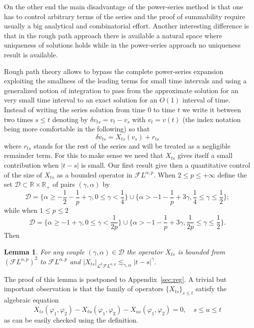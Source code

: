 \documentclass[a4paper,11pt,reqno]{article}
\newcommand{\der}{\delta}
\newcommand{\RR}{\mathbb{R}}
\newcommand{\DD}{\mathcal{D}}
\newcommand{\FF}{\mathcal{F}}
\newcommand{\LL}{\mathcal{L}}
\newtheorem{lemma}[theorem]{Lemma}
\begin{document}
  On the other end the main disadvantage  of the power-series method is that one has to control  arbitrary terms of the series and the proof of summability require usually a big analytical and combinatorial effort. 
  Another interesting difference is that in the rough path approach there is available a natural space where uniqueness of solutions holds while in the power-series approach no uniqueness result is available.

  Rough path theory allows to bypass the complete power-series expansion exploiting the smallness  of the leading terms for small time intervals and using a generalized notion of integration to pass from the approximate solution for an very small time interval to an exact solution for an $O(1)$ interval of time. 
Instead of writing the series solution from time $0$ to time $t$ we write it between two times $ s \le t$ denoting by $\der v_{ts} = v_t - v_s$ with $v_t = v(t)$ (the index
notation being more comfortable in the following) so that
\begin{equation}
\label{eq:kdv-base-remainder}
 \der v_{ts} = X_{ts}(v_s) + r_{ts}
\end{equation}
where $r_{ts}$ stands for the rest of the series and will be treated  as a negligible remainder term. For this to make sense we need that $X_{ts}$ gives itself a small contribution when $|t-s|$ is small. Our first result give then a quantitative control of the size of $X_{ts}$ as a bounded operator in $\FF L^{\alpha,p}$.
When $2\le p\le +\infty$ define the set $\DD\subset \RR \times \RR_+$ of pairs $(\gamma,\alpha)$ by
$$\DD =\{
\alpha \ge -\frac{1}{2}-\frac 1 p + \gamma, 0 \le \gamma < \frac14 
\} \cup
\{
\alpha > -1-\frac 1 p + 3\gamma, \frac1 4 \le \gamma \le \frac12 \} ;
$$
while when $1 \le p \le 2$ 
$$
\DD = \{
\alpha \ge -1 + \gamma, 0 \le \gamma < \frac1{2p} \} \cup
\{
\alpha > -1-\frac 1 p + 3\gamma, \frac1 {2p} \le \gamma \le \frac12\} .
$$
Then
\begin{lemma}
\label{lemma:X}
For any couple
$(\gamma,\alpha) \in \DD$ 
the operator $X_{ts}$ is bounded from $(\FF L^{\alpha,p})^2$ to
$\FF L^{\alpha,p}$ and
$
|X_{ts}|_{\LL^2 \FF L^{\alpha,p}} \lesssim_{\gamma,\alpha} |t-s|^\gamma .
$
\end{lemma}

The proof of this lemma is postponed to Appendix~\ref{sec:reg}.
  A trivial but important observation is that the family of operators $\{X_{ts} \}_{ s \le t }$ satisfy the algebraic equation
\begin{equation}
  \label{eq:X-chain}
X_{ts}(\varphi_1,\varphi_2) - X_{tu}(\varphi_1,\varphi_2) -
X_{us}(\varphi_1,\varphi_2) = 0, \quad  s\le u\le t 
\end{equation}
as can be easily checked using the definition.
\end{document}

